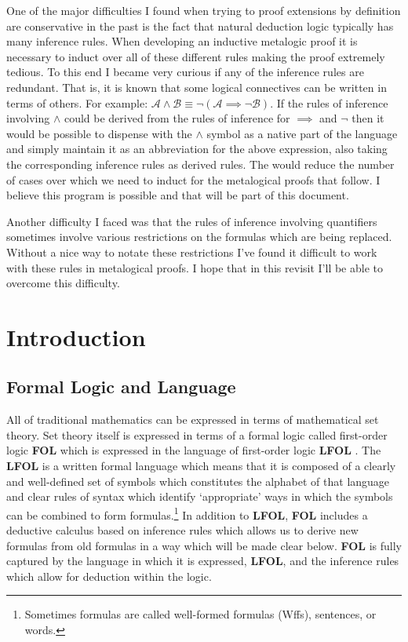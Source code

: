 \documentclass[12pt]{article}
\theoremstyle{break}
\theoremstyle{break}
\theoremstyle{break}
\theoremstyle{break}
\theoremstyle{break}
\newtheorem{informal definition}[definition]{Informal Definition}
\newcommand{\mc}[1]{\mathcal{#1}}
\begin{document}
One of the major difficulties I found when trying to proof extensions by definition are conservative in the past is the fact that natural deduction logic typically has many inference rules.
When developing an inductive metalogic proof it is necessary to induct over all of these different rules making the proof extremely tedious.
To this end I became very curious if any of the inference rules are redundant.
That is, it is known that some logical connectives can be written in terms of others.
For example: $\mc{A}\land\mc{B} \equiv \lnot(\mc{A}\implies \lnot\mc{B})$.
If the rules of inference involving $\land$ could be derived from the rules of inference for $\implies$ and $\lnot$ then it would be possible to dispense with the $\land$ symbol as a native part of the language and simply maintain it as an abbreviation for the above expression, also taking the corresponding inference rules as derived rules.
The would reduce the number of cases over which we need to induct for the metalogical proofs that follow.
I believe this program is possible and that will be part of this document.

Another difficulty I faced was that the rules of inference involving quantifiers sometimes involve various restrictions on the formulas which are being replaced.
Without a nice way to notate these restrictions I've found it difficult to work with these rules in metalogical proofs.
I hope that in this revisit I'll be able to overcome this difficulty.


\newpage
\section{Introduction}

\subsection{Formal Logic and Language}
All of traditional mathematics can be expressed in terms of mathematical set theory.
Set theory itself is expressed in terms of a formal logic called first-order logic \textbf{FOL} which is expressed in the language of first-order logic \textbf{LFOL} .
The \textbf{LFOL} is a written formal language which means that it is composed of a clearly and well-defined set of symbols which constitutes the alphabet of that language and clear rules of syntax which identify `appropriate' ways in which the symbols can be combined to form formulas.\footnote{Sometimes formulas are called well-formed formulas (Wffs), sentences, or words.}
In addition to \textbf{LFOL}, \textbf{FOL} includes a deductive calculus based on inference rules which allows us to derive new formulas from old formulas in a way which will be made clear below.
\textbf{FOL} is fully captured by the language in which it is expressed, \textbf{LFOL}, and the inference rules which allow for deduction within the logic.
\end{document}
